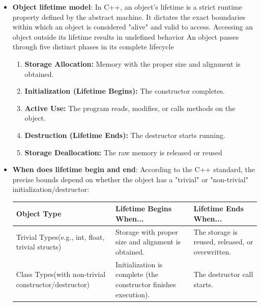 \documentclass{report}
\begin{document}
\begin{itemize}
\begin{cppcode}
                display("literal");
                display(std::string{"temporary"});
                display(existing_string);
            \end{cppcode}
            \bigbreak \noindent 
            The risk is that std::string\_view does not own or extend the lifetime of the characters. Storing a view after its source is destroyed or modified can leave it dangling:
        \item \textbf{Object lifetime model}: In C++, an object's lifetime is a strict runtime property defined by the abstract machine. It dictates the exact boundaries within which an object is considered "alive" and valid to access. Accessing an object outside its lifetime results in undefined behavior
            \bigbreak \noindent 
            An object passes through five distinct phases in its complete lifecycle
            \begin{enumerate}
                \item \textbf{Storage Allocation:} Memory with the proper size and alignment is obtained.
                \item \textbf{Initialization (Lifetime Begins):} The constructor completes.
                \item \textbf{Active Use:} The program reads, modifies, or calls methods on the object.
                \item \textbf{Destruction (Lifetime Ends):} The destructor starts running.
                \item \textbf{Storage Deallocation:} The raw memory is released or reused
            \end{enumerate}
        \item \textbf{When does lifetime begin and end}: According to the C++ standard, the precise bounds depend on whether the object has a "trivial" or "non-trivial" initialization/destructor:
            \begin{center}
                \begin{tabularx}{\textwidth}{@{}XXX@{}}
                    \toprule
                    \textbf{Object Type}& \textbf{Lifetime Begins When...}& \textbf{Lifetime Ends When...} \\
                    \midrule
                    Trivial Types(e.g., int, float, trivial structs) & Storage with proper size and alignment is obtained. & The storage is reused, released, or overwritten. \\[5ex]
                    Class Types(with non-trivial constructor/destructor) & Initialization is complete (the constructor finishes execution). & The destructor call starts. \\

\end{tabularx}
\end{center}
\end{itemize}
\end{document}
